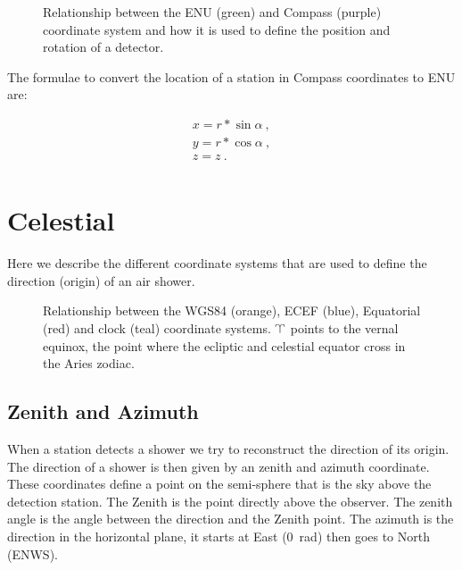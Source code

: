 \begin{figure}
    \centering
    
    \caption{Relationship between the ENU (green) and Compass (purple)
             coordinate system and how it is used to define the position
             and rotation of a detector.}
    \label{fig:enu_compass}
\end{figure}

The formulae to convert the location of a station in Compass coordinates
to ENU are:

\begin{equation}
    \begin{array}{l}
        x = r * \sin{\alpha} \ , \\
        y = r * \cos{\alpha} \ , \\
        z = z \ . \\
    \end{array}
\end{equation}


\section{Celestial}

Here we describe the different coordinate systems that are used to
define the direction (origin) of an air shower.

\begin{figure}
    \centering
    
    \caption{Relationship between the WGS84 (orange), ECEF (blue),
             Equatorial (red) and clock (teal) coordinate systems.
             $\vernal$ points to the vernal equinox, the point where the
             ecliptic and celestial equator cross in the Aries zodiac.}
    \label{fig:wgs84_equatorial}
\end{figure}


\subsection{Zenith and Azimuth}

When a station detects a shower we try to reconstruct the direction of
its origin. The direction of a shower is then given by an zenith and
azimuth coordinate. These coordinates define a point on the semi-sphere
that is the sky above the detection station. The Zenith is the point
directly above the observer. The zenith angle is the angle between the
direction and the Zenith point. The azimuth is the direction in the
horizontal plane, it starts at East (\SI{0}{\radian}) then goes to North
(ENWS).

